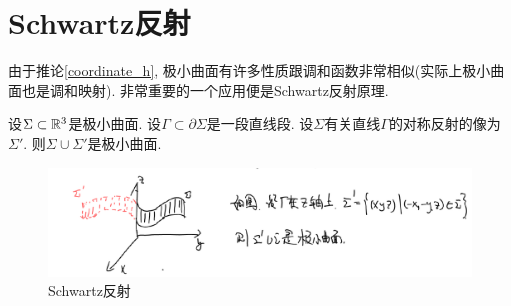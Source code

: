 \section{Schwartz反射}
由于推论\eqref{coordinate_h}, 极小曲面有许多性质跟调和函数非常相似(实际上极小曲面也是调和映射). 非常重要的一个应用便是Schwartz反射原理.
\begin{proposition} \label{min_reflection}
    设$\Sigma \subset \mathbb{R}^3$是极小曲面. 设$\Gamma \subset \partial \Sigma$是一段直线段. 设$\Sigma$有关直线$\Gamma$的对称反射的像为$\Sigma'$. 则$\Sigma \cup \Sigma'$是极小曲面.
\end{proposition}
   
\begin{figure}[ht]
	\centering
	\includegraphics[scale=0.5]{images/reflection1.png}
	\caption{Schwartz反射}
	\label{reflection1}
\end{figure}

